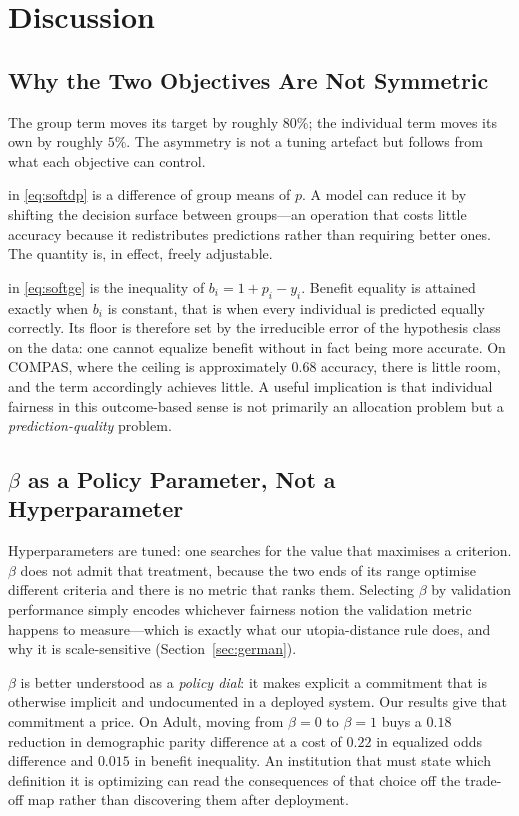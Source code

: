\section{Discussion}
\label{sec:discussion}

\subsection{Why the Two Objectives Are Not Symmetric}

The group term moves its target by roughly $80\%$; the individual term moves
its own by roughly $5\%$. The asymmetry is not a tuning artefact but follows
from what each objective can control.

\softdp{} in \eqref{eq:softdp} is a difference of group means of $p$. A model
can reduce it by shifting the decision surface between groups---an operation
that costs little accuracy because it redistributes predictions rather than
requiring better ones. The quantity is, in effect, freely adjustable.

\softge{} in \eqref{eq:softge} is the inequality of $b_i = 1 + p_i - y_i$.
Benefit equality is attained exactly when $b_i$ is constant, that is when
every individual is predicted equally correctly. Its floor is therefore set by
the irreducible error of the hypothesis class on the data: one cannot equalize
benefit without in fact being more accurate. On COMPAS, where the ceiling is
approximately $0.68$ accuracy, there is little room, and the term accordingly
achieves little. A useful implication is that individual fairness in this
outcome-based sense is not primarily an allocation problem but a
\emph{prediction-quality} problem.

\subsection{$\beta$ as a Policy Parameter, Not a Hyperparameter}

Hyperparameters are tuned: one searches for the value that maximises a
criterion. $\beta$ does not admit that treatment, because the two ends of its
range optimise different criteria and there is no metric that ranks them.
Selecting $\beta$ by validation performance simply encodes whichever fairness
notion the validation metric happens to measure---which is exactly what our
utopia-distance rule does, and why it is scale-sensitive
(Section~\ref{sec:german}).

$\beta$ is better understood as a \emph{policy dial}: it makes explicit a
commitment that is otherwise implicit and undocumented in a deployed system.
Our results give that commitment a price. On Adult, moving from $\beta=0$ to
$\beta=1$ buys a $0.18$ reduction in demographic parity difference at a cost
of $0.22$ in equalized odds difference and $0.015$ in benefit inequality. An
institution that must state which definition it is optimizing can read the
consequences of that choice off the trade-off map rather than discovering them
after deployment.

